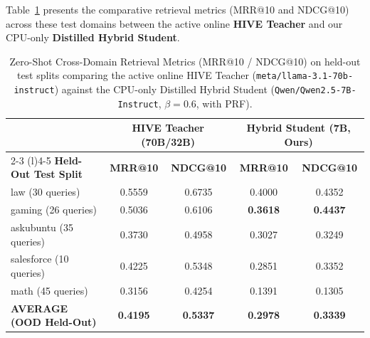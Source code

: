 \documentclass[11pt,a4paper]{article}
\begin{document}
Table~\ref{tab:new_heldout_results} presents the comparative retrieval metrics (MRR@10 and NDCG@10) across these test domains between the active online \textbf{HIVE Teacher} and our CPU-only \textbf{Distilled Hybrid Student}.

\begin{table}[htbp]
\centering
\scriptsize
\caption{Zero-Shot Cross-Domain Retrieval Metrics (MRR@10 / NDCG@10) on held-out test splits comparing the active online HIVE Teacher (\texttt{meta/llama-3.1-70b-instruct}) against the CPU-only Distilled Hybrid Student (\texttt{Qwen/Qwen2.5-7B-Instruct}, $\beta=0.6$, with PRF).}
\label{tab:new_heldout_results}
\begin{tabular}{lcccc}
\toprule
 & \multicolumn{2}{c}{\textbf{HIVE Teacher (70B/32B)}} & \multicolumn{2}{c}{\textbf{Hybrid Student (7B, Ours)}} \\
\cmidrule(r){2-3} \cmidrule(l){4-5}
\textbf{Held-Out Test Split} & \textbf{MRR@10} & \textbf{NDCG@10} & \textbf{MRR@10} & \textbf{NDCG@10} \\
\midrule
law (30 queries) & 0.5559 & 0.6735 & 0.4000 & 0.4352 \\
gaming (26 queries) & 0.5036 & 0.6106 & \textbf{0.3618} & \textbf{0.4437} \\
askubuntu (35 queries) & 0.3730 & 0.4958 & 0.3027 & 0.3249 \\
salesforce (10 queries) & 0.4225 & 0.5348 & 0.2851 & 0.3352 \\
math (45 queries) & 0.3156 & 0.4254 & 0.1391 & 0.1305 \\
\midrule
\textbf{AVERAGE (OOD Held-Out)} & \textbf{0.4195} & \textbf{0.5337} & \textbf{0.2978} & \textbf{0.3339} \\
\bottomrule
\end{tabular}
\end{table}
\end{document}
